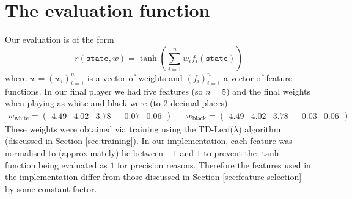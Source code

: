 \documentclass[11pt]{article}
\begin{document}
\section{The evaluation function} \label{sec:eval}
Our evaluation is of the form
\[
    r(\texttt{state}, w) = \tanh \left( \sum _{i=1} ^n w_i f_i(\texttt{state}) \right)
\]
where $w = (w_i) _{i=1} ^n$ is a vector of weights and $(f_i)_{i=1} ^n$ a vector of feature functions. In our final player we had five features (so $n = 5$) and the final weights when playing as white and black were (to 2 decimal places)
\begin{align*}
    w_{\textrm{white}} = \begin{pmatrix}
        4.49 & 4.02 &  3.78 & -0.07 & 0.06
    \end{pmatrix} 
    &&
    w_{\textrm{black}} = \begin{pmatrix}
        4.49 &  4.02 &  3.78 & -0.03 &  0.06
    \end{pmatrix}
\end{align*}
These weights were obtained via training using the TD-Leaf($\lambda$) algorithm (discussed in Section \ref{sec:training}). In our implementation, each feature was normalised to (approximately) lie between $-1$ and $1$ to prevent the $\tanh$ function being evaluated as $1$ for precision reasons. Therefore the features used in the implementation differ from those discussed in Section \ref{sec:feature-selection}  by some constant factor.
\end{document}
